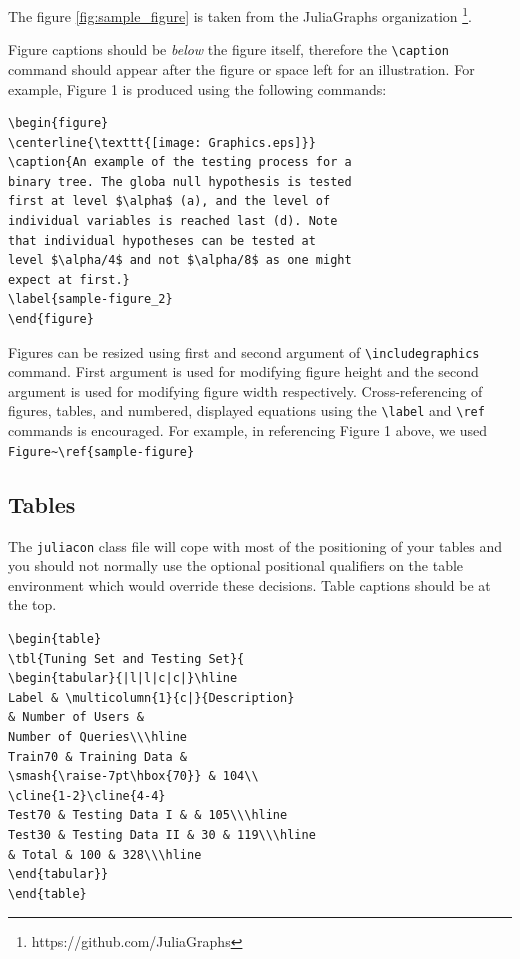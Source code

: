 \documentclass{juliacon}
\begin{document}
The figure \ref{fig:sample_figure} is taken from the JuliaGraphs
organization \footnote{https://github.com/JuliaGraphs}.

Figure captions should be \emph{below} the figure itself, therefore the
\verb|\caption|  command should appear after the figure or space left for
an illustration. For example, Figure 1 is produced using the following
commands:

\begin{verbatim}
\begin{figure}
\centerline{\texttt{[image: Graphics.eps]}}
\caption{An example of the testing process for a
binary tree. The globa null hypothesis is tested
first at level $\alpha$ (a), and the level of
individual variables is reached last (d). Note
that individual hypotheses can be tested at
level $\alpha/4$ and not $\alpha/8$ as one might
expect at first.}
\label{sample-figure_2}
\end{figure}
\end{verbatim}
Figures can be resized using first and second argument of
\verb|\includegraphics|   command. First argument is used for modifying
figure height and the second argument is used for modifying
figure width respectively.
\vskip 6pt
Cross-referencing of figures, tables, and numbered, displayed
equations using the \verb|\label|  and \verb|\ref|   commands is encouraged.
For example, in referencing Figure 1 above, we used
\verb|Figure~\ref{sample-figure}|

 \subsection{Tables}
\label{subsub:sec_Tab}
The \verb|juliacon|   class file will cope with most of the positioning of
your tables and you should not normally use the optional positional qualifiers on the table environment which would override these
decisions. Table captions should be at the top.
\begin{verbatim}
\begin{table}
\tbl{Tuning Set and Testing Set}{
\begin{tabular}{|l|l|c|c|}\hline
Label & \multicolumn{1}{c|}{Description}
& Number of Users &
Number of Queries\\\hline
Train70 & Training Data &
\smash{\raise-7pt\hbox{70}} & 104\\
\cline{1-2}\cline{4-4}
Test70 & Testing Data I & & 105\\\hline
Test30 & Testing Data II & 30 & 119\\\hline
& Total & 100 & 328\\\hline
\end{tabular}}
\end{table}
\end{verbatim}
\end{document}

